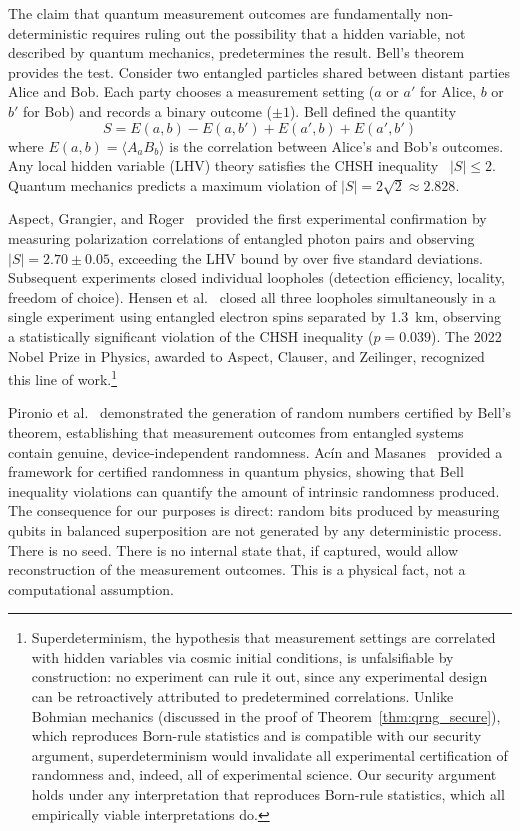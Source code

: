 \documentclass[journal]{IEEEtran}
\begin{document}
The claim that quantum measurement outcomes are fundamentally non-deterministic requires ruling out the possibility that a hidden variable, not described by quantum mechanics, predetermines the result. Bell's theorem~\cite{bell1964epr} provides the test. Consider two entangled particles shared between distant parties Alice and Bob. Each party chooses a measurement setting ($a$ or $a'$ for Alice, $b$ or $b'$ for Bob) and records a binary outcome ($\pm 1$). Bell defined the quantity
\begin{equation}
S = E(a, b) - E(a, b') + E(a', b) + E(a', b')
\label{eq:chsh}
\end{equation}
where $E(a, b) = \langle A_a B_b \rangle$ is the correlation between Alice's and Bob's outcomes. Any local hidden variable (LHV) theory satisfies the CHSH inequality~\cite{clauser1969chsh} $|S| \leq 2$. Quantum mechanics predicts a maximum violation of $|S| = 2\sqrt{2} \approx 2.828$.

Aspect, Grangier, and Roger~\cite{aspect1982epr} provided the first experimental confirmation by measuring polarization correlations of entangled photon pairs and observing $|S| = 2.70 \pm 0.05$, exceeding the LHV bound by over five standard deviations. Subsequent experiments closed individual loopholes (detection efficiency, locality, freedom of choice). Hensen et al.~\cite{hensen2015loophole} closed all three loopholes simultaneously in a single experiment using entangled electron spins separated by 1.3~km, observing a statistically significant violation of the CHSH inequality ($p = 0.039$). The 2022 Nobel Prize in Physics, awarded to Aspect, Clauser, and Zeilinger, recognized this line of work.\footnote{Superdeterminism, the hypothesis that measurement settings are correlated with hidden variables via cosmic initial conditions, is unfalsifiable by construction: no experiment can rule it out, since any experimental design can be retroactively attributed to predetermined correlations. Unlike Bohmian mechanics (discussed in the proof of Theorem~\ref{thm:qrng_secure}), which reproduces Born-rule statistics and is compatible with our security argument, superdeterminism would invalidate all experimental certification of randomness and, indeed, all of experimental science. Our security argument holds under any interpretation that reproduces Born-rule statistics, which all empirically viable interpretations do.}

Pironio et al.~\cite{pironio2010certified} demonstrated the generation of random numbers certified by Bell's theorem, establishing that measurement outcomes from entangled systems contain genuine, device-independent randomness. Ac\'{i}n and Masanes~\cite{acin2016certified} provided a framework for certified randomness in quantum physics, showing that Bell inequality violations can quantify the amount of intrinsic randomness produced. The consequence for our purposes is direct: random bits produced by measuring qubits in balanced superposition are not generated by any deterministic process. There is no seed. There is no internal state that, if captured, would allow reconstruction of the measurement outcomes. This is a physical fact, not a computational assumption.
\end{document}
